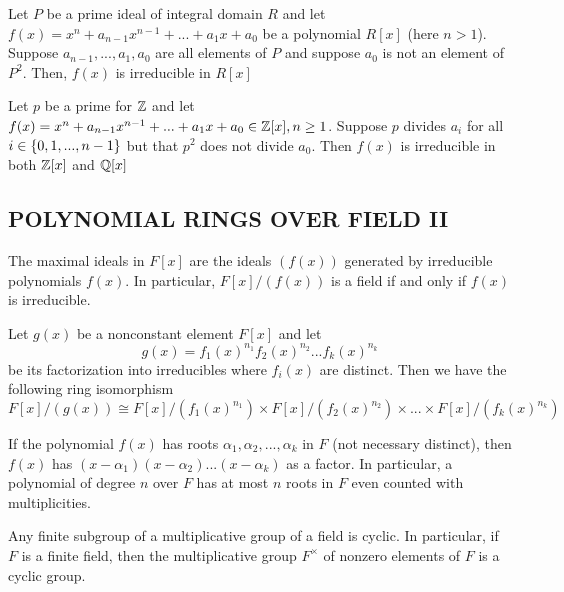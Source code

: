  \begin{proposition}
	Let $P$ be a prime ideal of integral domain $R$ and let $f(x) = x^n + a_{n-1} x^{n-1} + ... + a_1 x + a_0$ be a polynomial $R[x]$ (here $n > 1$). Suppose $a_{n-1}, ..., a_1, a_0$ are all elements of $P$ and suppose $a_0$ is not an element of $P^2$. Then, $f(x)$ is irreducible in $R[x]$
 \end{proposition}
 
\begin{proposition}
	Let $p$ be a prime for $\mathbb{Z}$ and let $f(x) = x^n + a_{n-1} x^{n-1} + ... + a_1 x + a_0 \in \mathbb{Z}[x], n \geq 1$. Suppose $p$ divides $a_i$ for all $i \in \{0, 1, ..., n-1\}$ but that $p^2$ does not divide $a_0$. Then $f(x)$ is irreducible in both $\mathbb{Z}[x]$ and $\mathbb{Q}[x]$
\end{proposition}

\subsection{POLYNOMIAL RINGS OVER FIELD II}
 
\begin{proposition}
	The maximal ideals in $F[x]$ are the ideals $(f(x))$ generated by irreducible polynomials $f(x)$. In particular, $F[x] / (f(x))$ is a field if and only if $f(x)$ is irreducible.
\end{proposition}
 
\begin{proposition}
	Let $g(x)$ be a nonconstant element $F[x]$ and let 
	$$
		g(x) = f_1(x)^{n_1} f_2(x)^{n_2} ... f_k(x)^{n_k}
	$$
	be its factorization into irreducibles where $f_i(x)$ are distinct. Then we have the following ring isomorphism
	$$
		F[x] / (g(x)) \cong F[x] / (f_1(x)^{n_1}) \times F[x] / (f_2(x)^{n_2}) \times ... \times F[x] / (f_k(x)^{n_k})
	$$
\end{proposition}
 
\begin{proposition}
	If the polynomial $f(x)$ has roots $\alpha_1, \alpha_2, ..., \alpha_k$ in $F$ (not necessary distinct), then $f(x)$ has $(x - \alpha_1)(x - \alpha_2) ... (x - \alpha_k)$ as a factor. In particular, a polynomial of degree $n$ over $F$ has at most $n$ roots in $F$ even counted with multiplicities.
\end{proposition}
 
\begin{proposition}
	Any finite subgroup of a multiplicative group of a field is cyclic. In particular, if $F$ is a finite field, then the multiplicative group $F^\times$ of nonzero elements of $F$ is a cyclic group.
\end{proposition}
 
